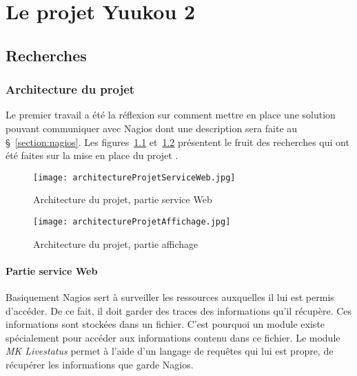 \chapter{Le projet Yuukou 2}

\section{Recherches}

\subsection{Architecture du projet}
\label{section:architectureProjet}

Le premier travail a \'et\'e la r\'eflexion sur comment mettre en place une solution pouvant communiquer avec Nagios dont une description sera faite au \S~\ref{section:nagios}.
Les figures~\ref{figure:architectureProjetServiceWeb} et~\ref{figure:architectureProjetAffichage} pr\'esentent le fruit des recherches qui ont \'et\'e faites sur la mise en place du projet \YuukouII.

\begin{figure}[!ht]
	\centering
	\texttt{[image: architectureProjetServiceWeb.jpg]}
	\caption{Architecture du projet, partie service Web}
	\label{figure:architectureProjetServiceWeb}

\end{figure}

\begin{figure}[!ht]
	\centering
	\texttt{[image: architectureProjetAffichage.jpg]}
	\caption{Architecture du projet, partie affichage}
	\label{figure:architectureProjetAffichage}

\end{figure}

\subsubsection{Partie service Web}

Basiquement Nagios sert \`a surveiller les ressources auxquelles il lui est permis d'acc\'eder.
De ce fait, il doit garder des traces des informations qu'il r\'ecup\`ere.
Ces informations sont stock\'ees dans un fichier.
C'est pourquoi un module existe sp\'ecialement pour acc\'eder aux informations contenu dans ce fichier. 
Le module \textit{MK Livestatus} permet \`a l'aide d'un langage de requ\^etes qui lui est propre, de r\'ecup\'erer les informations que garde Nagios.

